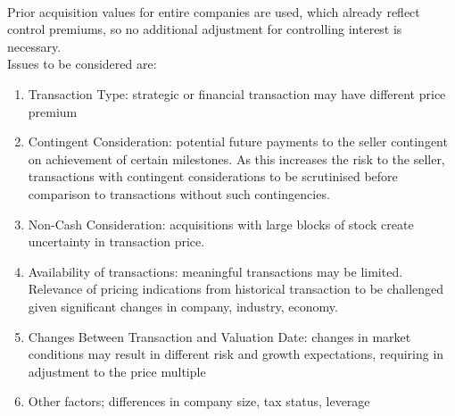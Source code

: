 \begin{method} \\
Prior acquisition values for entire companies are used, which already reflect control premiums, so no additional adjustment for controlling interest is necessary.\\
Issues to be considered are:
\begin{enumerate}[label=\roman*.]
\setlength{\itemsep}{0pt}
\item Transaction Type: strategic or financial transaction may have different price premium
\item Contingent Consideration: potential future payments to the seller contingent on achievement of certain milestones. As this increases the risk to the seller, transactions with contingent considerations to be scrutinised before comparison to transactions without such contingencies.
\item Non-Cash Consideration: acquisitions with large blocks of stock create uncertainty in transaction price.
\item Availability of transactions: meaningful transactions may be limited. Relevance of pricing indications from historical transaction to be challenged given significant changes in company, industry, economy.
\item Changes Between Transaction and Valuation Date: changes in market conditions may result in different risk and growth expectations, requiring in adjustment to the price multiple
\item Other factors; differences in company size, tax status, leverage
\end{enumerate}
\end{method}